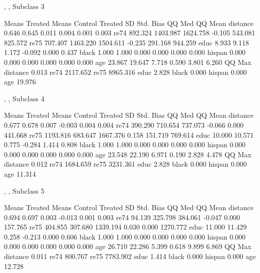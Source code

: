 \documentclass[oneside,letterpaper,titlepage]{article}
\begin{document}
\begin{enumerate}
\begin{Schunk}
\begin{Soutput}
, , Subclass 3

         Means Treated Means Control Treated SD Std. Bias    QQ Med   QQ Mean
distance         0.646         0.645      0.011     0.004     0.001     0.003
re74           892.324      1403.987   1624.758    -0.105   543.081   825.572
re75           707.407      1463.220   1504.611    -0.235   291.168   944.259
educ             8.933         9.118      1.172    -0.092     0.000     0.437
black            1.000         1.000      0.000     0.000     0.000     0.000
hispan           0.000         0.000      0.000     0.000     0.000     0.000
age             23.867        19.647      7.718     0.590     3.801     6.260
            QQ Max
distance     0.013
re74      2117.652
re75      8965.316
educ         2.828
black        0.000
hispan       0.000
age         19.976

, , Subclass 4

         Means Treated Means Control Treated SD Std. Bias    QQ Med   QQ Mean
distance         0.677         0.678      0.007    -0.003     0.004     0.004
re74           390.290       710.654    737.073    -0.066     0.000   441.668
re75          1193.816       683.647   1667.376     0.158   151.719   769.614
educ            10.000        10.571      0.775    -0.284     1.414     0.808
black            1.000         1.000      0.000     0.000     0.000     0.000
hispan           0.000         0.000      0.000     0.000     0.000     0.000
age             23.548        22.190      6.971     0.190     2.828     4.478
            QQ Max
distance     0.012
re74      1684.659
re75      3231.361
educ         2.828
black        0.000
hispan       0.000
age         11.314

, , Subclass 5

         Means Treated Means Control Treated SD Std. Bias    QQ Med   QQ Mean
distance         0.694         0.697      0.003    -0.013     0.001     0.003
re74            94.139       325.798    384.061    -0.047     0.000   157.765
re75           404.855       307.680   1339.194     0.030     0.000  1270.772
educ            11.000        11.429      0.258    -0.213     0.000     0.606
black            1.000         1.000      0.000     0.000     0.000     0.000
hispan           0.000         0.000      0.000     0.000     0.000     0.000
age             26.710        22.286      5.399     0.618     9.899     6.869
            QQ Max
distance     0.011
re74       800.767
re75      7783.902
educ         1.414
black        0.000
hispan       0.000
age         12.728


\end{Soutput}
\end{Schunk}
\end{enumerate}
\end{document}

